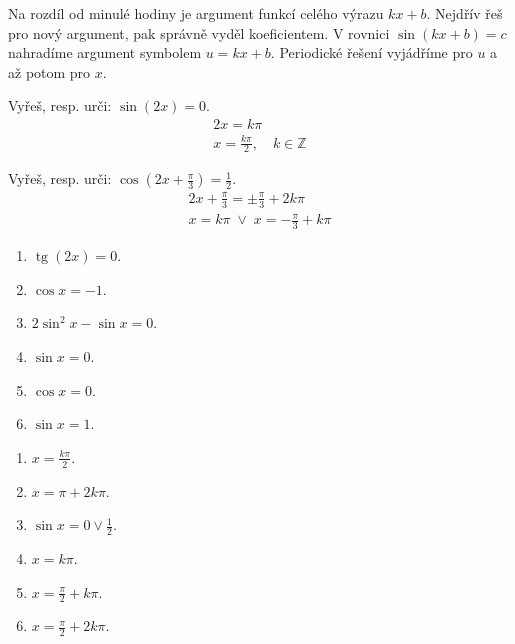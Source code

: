 \documentclass[11pt,a4paper]{article}
\begin{document}
Na rozdíl od minulé hodiny je argument funkcí celého výrazu $kx+b$. Nejdřív řeš pro nový argument, pak správně vyděl koeficientem.
V rovnici $\sin(kx+b)=c$ nahradíme argument symbolem $u=kx+b$. Periodické řešení vyjádříme pro $u$ a až potom pro $x$.
\begin{prikladReseniBox}[title={Příklad 1}]
Vyřeš, resp. urči: $\sin(2x)=0$.
\tcblower
\[\begin{aligned}2x=k\pi \\ x=\frac{k\pi}{2},\quad k\in\mathbb Z\end{aligned}\]
\end{prikladReseniBox}
\begin{prikladReseniBox}[title={Příklad 2}]
Vyřeš, resp. urči: $\cos\left(2x+\frac{\pi}{3}\right)=\frac{1}{2}$.
\tcblower
\[\begin{aligned}2x+\frac{\pi}{3}=\pm\frac{\pi}{3}+2k\pi \\ x=k\pi\;\lor\;x=-\frac{\pi}{3}+k\pi\end{aligned}\]
\end{prikladReseniBox}
\begin{zadaniReseniBox}[title={Samostatná práce 1}]
\begin{enumerate}[label=\alph*)]
\item $\operatorname{tg}(2x)=0$.
\item $\cos x=-1$.
\item $2\sin^2x-\sin x=0$.
\item $\sin x=0$.
\item $\cos x=0$.
\item $\sin x=1$.
\end{enumerate}
\tcblower
\begin{enumerate}[label=\alph*)]
\item $x=\frac{k\pi}{2}$.
\item $x=\pi+2k\pi$.
\item $\sin x=0\lor\frac{1}{2}$.
\item $x=k\pi$.
\item $x=\frac{\pi}{2}+k\pi$.
\item $x=\frac{\pi}{2}+2k\pi$.
\end{enumerate}
\end{zadaniReseniBox}
\end{document}
